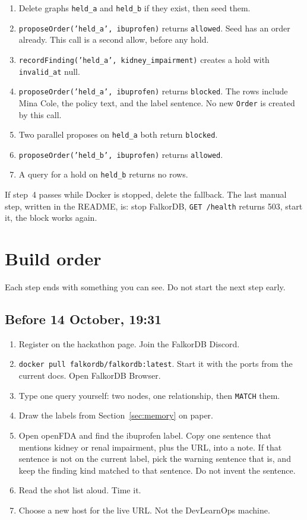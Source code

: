 \documentclass[11pt,a4paper]{article}
\newcommand{\code}[1]{\texttt{#1}}
\begin{document}
\begin{enumerate}
  \item Delete graphs \code{held\_a} and \code{held\_b} if they exist, then seed them.
  \item \code{proposeOrder('held\_a', ibuprofen)} returns \code{allowed}. Seed has an order already. This call is a second allow, before any hold.
  \item \code{recordFinding('held\_a', kidney\_impairment)} creates a hold with \code{invalid\_at} null.
  \item \code{proposeOrder('held\_a', ibuprofen)} returns \code{blocked}. The rows include Mina Cole, the policy text, and the label sentence. No new \code{Order} is created by this call.
  \item Two parallel proposes on \code{held\_a} both return \code{blocked}.
  \item \code{proposeOrder('held\_b', ibuprofen)} returns \code{allowed}.
  \item A query for a hold on \code{held\_b} returns no rows.
\end{enumerate}

If step~4 passes while Docker is stopped, delete the fallback. The last manual step, written in the README, is: stop FalkorDB, \code{GET /health} returns 503, start it, the block works again.

\section{Build order}

Each step ends with something you can see. Do not start the next step early.

\subsection{Before 14 October, 19:31}

\begin{enumerate}
  \item Register on the hackathon page. Join the FalkorDB Discord.
  \item \code{docker pull falkordb/falkordb:latest}. Start it with the ports from the current docs. Open FalkorDB Browser.
  \item Type one query yourself: two nodes, one relationship, then \code{MATCH} them.
  \item Draw the labels from Section~\ref{sec:memory} on paper.
  \item Open openFDA and find the ibuprofen label. Copy one sentence that mentions kidney or renal impairment, plus the URL, into a note. If that sentence is not on the current label, pick the warning sentence that is, and keep the finding kind matched to that sentence. Do not invent the sentence.
  \item Read the shot list aloud. Time it.
  \item Choose a new host for the live URL. Not the DevLearnOps machine.
\end{enumerate}
\end{document}
